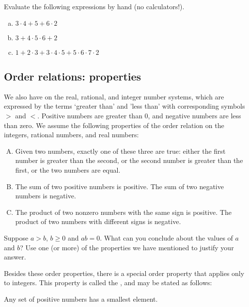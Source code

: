 \begin{exercise}{}
Evaluate the following expressions by hand (no calculators!).
\begin{enumerate}[(a)]
\item
$3 \cdot 4 + 5 + 6 \cdot 2$
\item
$3 + 4 \cdot 5 \cdot 6 + 2$
\item
$1 + 2 \cdot 3 + 3 \cdot 4 \cdot 5 + 5 \cdot 6 \cdot 7 \cdot 2$
\end{enumerate}
\end{exercise}


\subsection{Order relations: properties}\label{subsec:orderprop}
We also have  on the real, rational, and integer number systems, which are expressed by the terms `greater than'  and 'less than' with corresponding symbols $>$ and $<$. Positive numbers are greater than 0, and negative numbers are less than zero. We assume the following properties of the order relation on the integers, rational numbers, and real numbers:

\begin{enumerate}[(A)] 
\item
Given two numbers, exactly one of these three are true: either the first number is greater than the second, or the second number is greater than the first, or the two numbers are equal.
\item
The sum of two  positive numbers  is positive. The sum of two negative numbers is negative.
\item
The product of two  nonzero numbers with the same sign is positive. The product of two numbers with different signs is negative.
\end{enumerate}

\begin{exercise}{3}
Suppose $a > b$,  $b \ge 0$ and $ab = 0$.  What can you conclude about the values of $a$ and $b$? Use one (or more)  of the properties we have mentioned to justify your answer.
\end{exercise}

Besides these order properties, there is a special order property that applies only to integers. This property is called the , and may be stated as follows:

\begin{center}
Any set of positive numbers has a smallest element.
\end{center}

